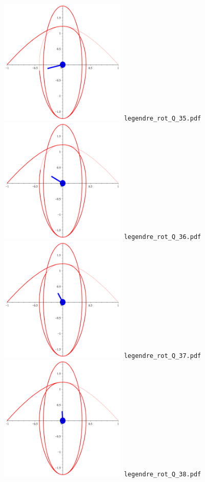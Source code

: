 \documentclass[a4paper]{amsart}
\begin{document}
\includegraphics[width=6cm]{legendre_rot_Q_35.pdf}\verb+ legendre_rot_Q_35.pdf+\\
\includegraphics[width=6cm]{legendre_rot_Q_36.pdf}\verb+ legendre_rot_Q_36.pdf+\\
\includegraphics[width=6cm]{legendre_rot_Q_37.pdf}\verb+ legendre_rot_Q_37.pdf+\\
\includegraphics[width=6cm]{legendre_rot_Q_38.pdf}\verb+ legendre_rot_Q_38.pdf+\\
\end{document}
